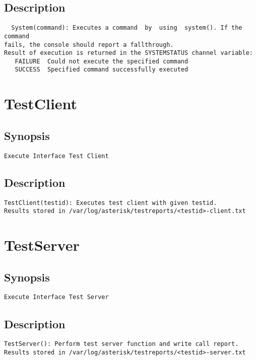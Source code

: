 \subsection{Description}
\begin{verbatim}
  System(command): Executes a command  by  using  system(). If the command
fails, the console should report a fallthrough. 
Result of execution is returned in the SYSTEMSTATUS channel variable:
   FAILURE	Could not execute the specified command
   SUCCESS	Specified command successfully executed

\end{verbatim}


\section{TestClient}
\subsection{Synopsis}
\begin{verbatim}
Execute Interface Test Client
\end{verbatim}
\subsection{Description}
\begin{verbatim}
TestClient(testid): Executes test client with given testid.
Results stored in /var/log/asterisk/testreports/<testid>-client.txt
\end{verbatim}


\section{TestServer}
\subsection{Synopsis}
\begin{verbatim}
Execute Interface Test Server
\end{verbatim}
\subsection{Description}
\begin{verbatim}
TestServer(): Perform test server function and write call report.
Results stored in /var/log/asterisk/testreports/<testid>-server.txt
\end{verbatim}


